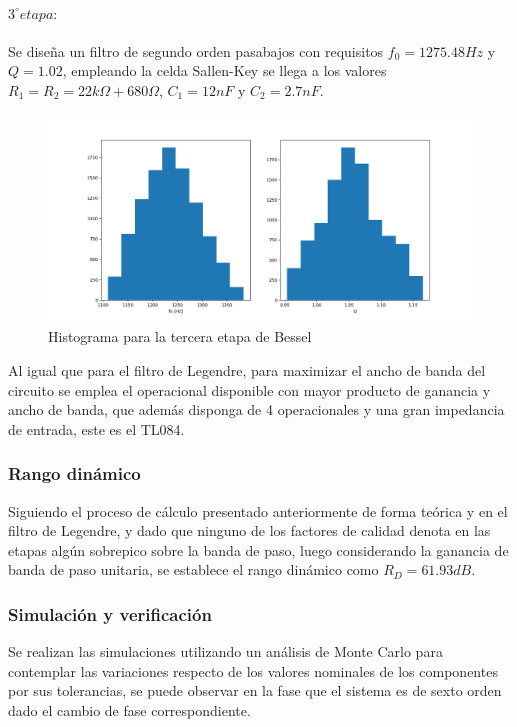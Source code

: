 \paragraph{$3^{\circ} etapa:$} Se dise\~na un filtro de segundo orden pasabajos con requisitos $f_0 = 1275.48Hz$ y $Q = 1.02$, empleando la celda Sallen-Key se llega a los valores $R_1 = R_2 = 22k \Omega + 680\Omega$, $C_1 = 12nF$ y $C_2 = 2.7nF$.

\begin{figure}[H]
    \centering
    \includegraphics[scale=0.4]{../EJ1/Recursos/bessel_histogram_three.png}
    \caption{Histograma para la tercera etapa de Bessel}
    \label{fig:bessel_histogram_three}
\end{figure}

Al igual que para el filtro de Legendre, para maximizar el ancho de banda del circuito se emplea el operacional disponible con mayor producto de ganancia y ancho de banda, que adem\'as disponga de 4 operacionales y una gran impedancia de entrada, este es el TL084.

\subsubsection{Rango din\'amico}
Siguiendo el proceso de c\'alculo presentado anteriormente de forma te\'orica y en el filtro de Legendre, y dado que ninguno de los factores de calidad denota en las etapas alg\'un sobrepico sobre la banda de paso, luego
considerando la ganancia de banda de paso unitaria, se establece el rango din\'amico como $R_D = 61.93dB$.

\subsubsection{Simulaci\'on y verificaci\'on}
Se realizan las simulaciones utilizando un an\'alisis de Monte Carlo para contemplar las variaciones respecto de los valores nominales de los componentes por sus tolerancias,
se puede observar en la fase que el sistema es de sexto orden dado el cambio de fase correspondiente.

